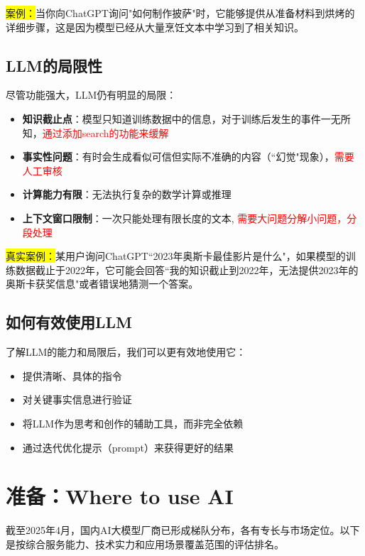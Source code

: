 \documentclass{article}
\begin{document}
\colorbox{yellow}{案例：}当你向ChatGPT询问"如何制作披萨"时，它能够提供从准备材料到烘烤的详细步骤，这是因为模型已经从大量烹饪文本中学习到了相关知识。

\subsection{LLM的局限性}
尽管功能强大，LLM仍有明显的局限：

\begin{itemize}
  \item \textbf{知识截止点}：模型只知道训练数据中的信息，对于训练后发生的事件一无所知，\textcolor{red}{通过添加search的功能来缓解}
  \item \textbf{事实性问题}：有时会生成看似可信但实际不准确的内容（``幻觉"现象），\textcolor{red}{需要人工审核}
  \item \textbf{计算能力有限}：无法执行复杂的数学计算或推理
  \item \textbf{上下文窗口限制}：一次只能处理有限长度的文本, \textcolor{red}{需要大问题分解小问题，分段处理}
\end{itemize}

\colorbox{yellow}{真实案例：}某用户询问ChatGPT``2023年奥斯卡最佳影片是什么"，如果模型的训练数据截止于2022年，它可能会回答``我的知识截止到2022年，无法提供2023年的奥斯卡获奖信息"或者错误地猜测一个答案。

\subsection{如何有效使用LLM}
了解LLM的能力和局限后，我们可以更有效地使用它：

\begin{itemize}
  \item 提供清晰、具体的指令
  \item 对关键事实信息进行验证
  \item 将LLM作为思考和创作的辅助工具，而非完全依赖
  \item 通过迭代优化提示（prompt）来获得更好的结果
\end{itemize}

\begin{center}
  {\LARGE  {}}
\end{center}

\newpage

\section{准备：Where to use AI}
截至2025年4月，国内AI大模型厂商已形成梯队分布，各有专长与市场定位。以下是按综合服务能力、技术实力和应用场景覆盖范围的评估排名。
\end{document}

